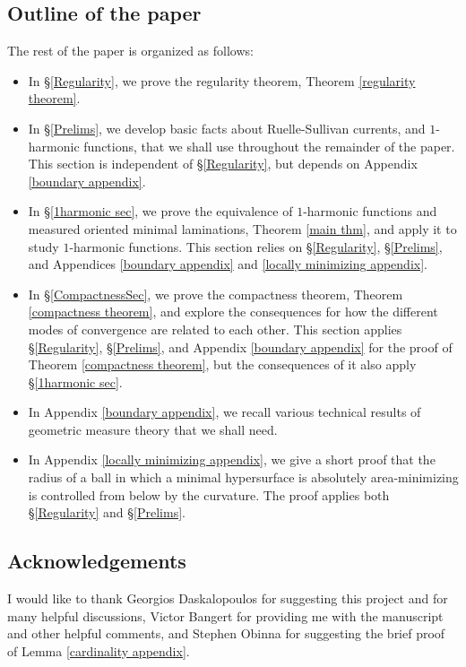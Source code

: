 \documentclass[reqno,11pt]{amsart}
\theoremstyle{definition}
\numberwithin{equation}{section}
\begin{document}
\subsection{Outline of the paper}
The rest of the paper is organized as follows:
\begin{itemize}
\item In \S\ref{Regularity}, we prove the regularity theorem, Theorem \ref{regularity theorem}.
\item In \S\ref{Prelims}, we develop basic facts about Ruelle-Sullivan currents, and $1$-harmonic functions, that we shall use throughout the remainder of the paper. This section is independent of \S\ref{Regularity}, but depends on Appendix \ref{boundary appendix}.
\item In \S\ref{1harmonic sec}, we prove the equivalence of $1$-harmonic functions and measured oriented minimal laminations, Theorem \ref{main thm}, and apply it to study $1$-harmonic functions. This section relies on \S\ref{Regularity}, \S\ref{Prelims}, and Appendices \ref{boundary appendix} and \ref{locally minimizing appendix}.
\item In \S\ref{CompactnessSec}, we prove the compactness theorem, Theorem \ref{compactness theorem}, and explore the consequences for how the different modes of convergence are related to each other. This section applies \S\ref{Regularity}, \S\ref{Prelims}, and Appendix \ref{boundary appendix} for the proof of Theorem \ref{compactness theorem}, but the consequences of it also apply \S\ref{1harmonic sec}.
\item In Appendix \ref{boundary appendix}, we recall various technical results of geometric measure theory that we shall need.
\item In Appendix \ref{locally minimizing appendix}, we give a short proof that the radius of a ball in which a minimal hypersurface is absolutely area-minimizing is controlled from below by the curvature. The proof applies both \S\ref{Regularity} and \S\ref{Prelims}.
\end{itemize}


\subsection{Acknowledgements}
I would like to thank Georgios Daskalopoulos for suggesting this project and for many helpful discussions, Victor Bangert for providing me with the manuscript \cite{Auer12} and other helpful comments, and Stephen Obinna for suggesting the brief proof of Lemma \ref{cardinality appendix}.
\end{document}
